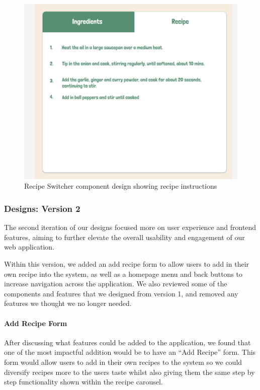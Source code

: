 \documentclass{article}
\begin{document}
\begin{figure}[h]
  \includegraphics[width=1.0\textwidth]{assets/design-images/Version 1 Recipe Switcher recipe.png}
  \centering
  \caption{Recipe Switcher component design showing recipe instructions}
\end{figure}

\subsubsection{Designs: Version 2}
The second iteration of our designs focused more on user experience and frontend features, aiming to further elevate the overall usability and engagement of our web application.

Within this version, we added an add recipe form to allow users to add in their own recipe into the system, as well as a homepage menu and back buttons to increase navigation across the application. We also reviewed some of the components and features that we designed from version 1, and removed any features we thought we no longer needed.

\paragraph{Add Recipe Form}
After discussing what features could be added to the application, we found that one of the most impactful addition would be to have an “Add Recipe” form. This form would allow users to add in their own recipes to the system so we could diversify recipes more to the users taste whilst also giving them the same step by step functionality shown within the recipe carousel.
\end{document}
